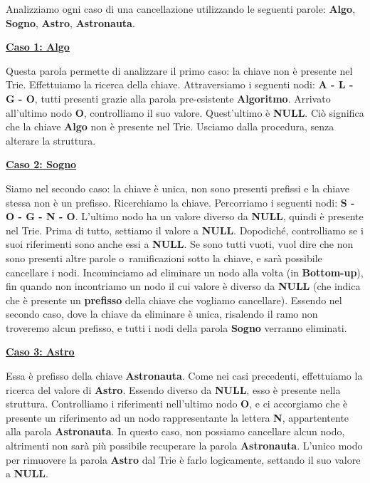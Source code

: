 \documentclass[a4paper, 12pt]{article}
\begin{document}
Analizziamo ogni caso di una cancellazione utilizzando le seguenti parole: \textbf{Algo}, \textbf{Sogno}, \textbf{Astro}, \textbf{Astronauta}.

\clearpage

\textbf{\underline{Caso 1: Algo}}

\vspace{5mm}
Questa parola permette di analizzare il primo caso: la chiave non è presente nel Trie.
Effettuiamo la ricerca della chiave. Attraversiamo i seguenti nodi: \textbf{A - L - G - O}, tutti presenti grazie alla parola pre-esistente \textbf{Algoritmo}.
Arrivato all'ultimo nodo \textbf{O}, controlliamo il suo valore. Quest'ultimo è \textbf{NULL}. Ciò significa che la chiave \textbf{Algo} non è presente nel Trie. Usciamo dalla procedura, senza alterare la struttura.

\vspace{5mm}

\textbf{\underline{Caso 2: Sogno}}

\vspace{5mm}
Siamo nel secondo caso: la chiave è unica, non sono presenti prefissi e la chiave stessa non è un prefisso.
Ricerchiamo la chiave. Percorriamo i seguenti nodi: \textbf{S - O - G - N - O}. L'ultimo nodo ha un valore diverso da \textbf{NULL}, quindi è presente nel Trie. 
Prima di tutto, settiamo il valore a \textbf{NULL}. Dopodiché, controlliamo se i suoi riferimenti sono anche essi a \textbf{NULL}. Se sono tutti vuoti, vuol dire che non sono presenti altre parole o~ramificazioni sotto la chiave, e sarà possibile cancellare i nodi. Incominciamo ad eliminare un nodo alla volta (in \textbf{Bottom-up}), fin quando non incontriamo un nodo il cui valore è diverso da \textbf{NULL} (che indica che è presente un \textbf{prefisso} della chiave che vogliamo cancellare). Essendo nel secondo caso, dove la chiave da eliminare è unica, risalendo il ramo non troveremo alcun prefisso, e tutti i nodi della parola \textbf{Sogno} verranno eliminati.

\clearpage

\textbf{\underline{Caso 3: Astro}}

\vspace{5mm}
Essa è prefisso della chiave \textbf{Astronauta}. Come nei casi precedenti, effettuiamo la ricerca del valore di \textbf{Astro}. Essendo diverso da \textbf{NULL}, esso è presente nella struttura. Controlliamo i riferimenti nell'ultimo nodo \textbf{O}, e ci accorgiamo che è presente un riferimento ad un nodo rappresentante la lettera \textbf{N}, appartentente alla parola \textbf{Astronauta}. In questo caso, non possiamo cancellare alcun nodo, altrimenti non sarà più possibile recuperare la parola \textbf{Astronauta}. L'unico modo per rimuovere la parola \textbf{Astro} dal Trie è farlo logicamente, settando il suo valore a \textbf{NULL}.
\end{document}
